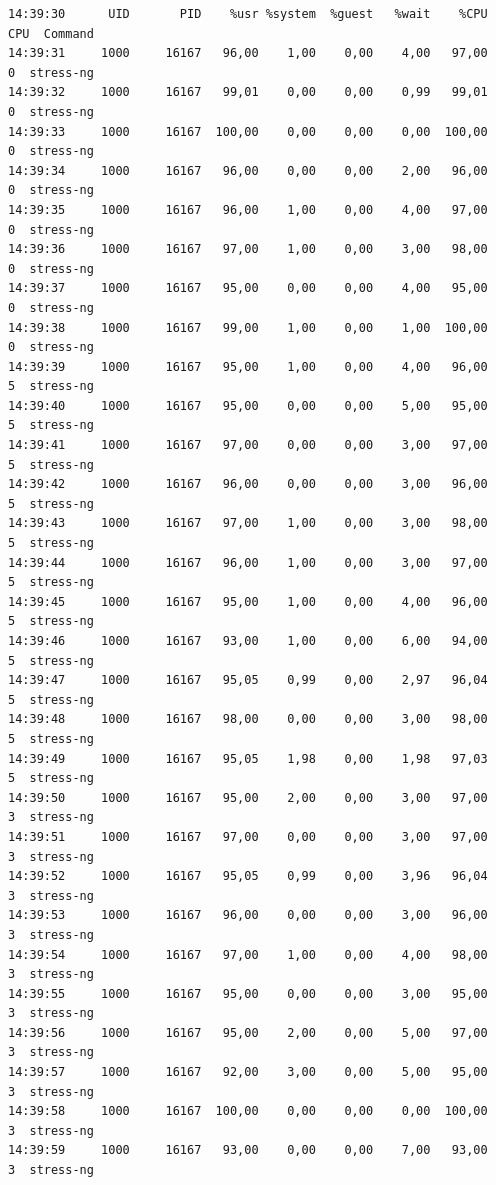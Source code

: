 \documentclass[12pt,onecolumn]{article}
\begin{document}
\begin{verbatim}
14:39:30      UID       PID    %usr %system  %guest   %wait    %CPU   CPU  Command
14:39:31     1000     16167   96,00    1,00    0,00    4,00   97,00     0  stress-ng
14:39:32     1000     16167   99,01    0,00    0,00    0,99   99,01     0  stress-ng
14:39:33     1000     16167  100,00    0,00    0,00    0,00  100,00     0  stress-ng
14:39:34     1000     16167   96,00    0,00    0,00    2,00   96,00     0  stress-ng
14:39:35     1000     16167   96,00    1,00    0,00    4,00   97,00     0  stress-ng
14:39:36     1000     16167   97,00    1,00    0,00    3,00   98,00     0  stress-ng
14:39:37     1000     16167   95,00    0,00    0,00    4,00   95,00     0  stress-ng
14:39:38     1000     16167   99,00    1,00    0,00    1,00  100,00     0  stress-ng
14:39:39     1000     16167   95,00    1,00    0,00    4,00   96,00     5  stress-ng
14:39:40     1000     16167   95,00    0,00    0,00    5,00   95,00     5  stress-ng
14:39:41     1000     16167   97,00    0,00    0,00    3,00   97,00     5  stress-ng
14:39:42     1000     16167   96,00    0,00    0,00    3,00   96,00     5  stress-ng
14:39:43     1000     16167   97,00    1,00    0,00    3,00   98,00     5  stress-ng
14:39:44     1000     16167   96,00    1,00    0,00    3,00   97,00     5  stress-ng
14:39:45     1000     16167   95,00    1,00    0,00    4,00   96,00     5  stress-ng
14:39:46     1000     16167   93,00    1,00    0,00    6,00   94,00     5  stress-ng
14:39:47     1000     16167   95,05    0,99    0,00    2,97   96,04     5  stress-ng
14:39:48     1000     16167   98,00    0,00    0,00    3,00   98,00     5  stress-ng
14:39:49     1000     16167   95,05    1,98    0,00    1,98   97,03     5  stress-ng
14:39:50     1000     16167   95,00    2,00    0,00    3,00   97,00     3  stress-ng
14:39:51     1000     16167   97,00    0,00    0,00    3,00   97,00     3  stress-ng
14:39:52     1000     16167   95,05    0,99    0,00    3,96   96,04     3  stress-ng
14:39:53     1000     16167   96,00    0,00    0,00    3,00   96,00     3  stress-ng
14:39:54     1000     16167   97,00    1,00    0,00    4,00   98,00     3  stress-ng
14:39:55     1000     16167   95,00    0,00    0,00    3,00   95,00     3  stress-ng
14:39:56     1000     16167   95,00    2,00    0,00    5,00   97,00     3  stress-ng
14:39:57     1000     16167   92,00    3,00    0,00    5,00   95,00     3  stress-ng
14:39:58     1000     16167  100,00    0,00    0,00    0,00  100,00     3  stress-ng
14:39:59     1000     16167   93,00    0,00    0,00    7,00   93,00     3  stress-ng

\end{verbatim}
\end{document}
